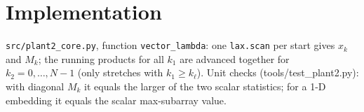 \documentclass[11pt]{article}
\begin{document}
\section{Implementation}
\texttt{src/plant2\_core.py}, function \texttt{vector\_lambda}: one \texttt{lax.scan} per start gives $x_k$ and $M_k$; the
running products for all $k_1$ are advanced together for $k_2 = 0, \dots, N-1$ (only stretches with $k_1 \ge k_\ell$).
Unit checks (tools/test\_plant2.py): with diagonal $M_k$ it equals the larger of the two scalar statistics; for a 1-D embedding it
equals the scalar max-subarray value.
\end{document}
